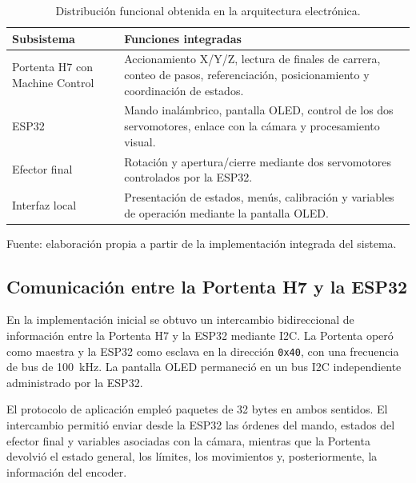 \begin{table}[H]
    \centering
    \caption{Distribución funcional obtenida en la arquitectura electrónica.}
    \label{tab:fase4_resultado_arquitectura}
    \begin{tabular}{p{}p{}}
        \hline
        Subsistema & Funciones integradas \\
        \hline
        Portenta H7 con Machine Control &
        Accionamiento X/Y/Z, lectura de finales de carrera, conteo de pasos, referenciación, posicionamiento y coordinación de estados. \\

        ESP32 &
        Mando inalámbrico, pantalla OLED, control de los dos servomotores, enlace con la cámara y procesamiento visual. \\

        Efector final &
        Rotación y apertura/cierre mediante dos servomotores controlados por la ESP32. \\

        Interfaz local &
        Presentación de estados, menús, calibración y variables de operación mediante la pantalla OLED. \\
        \hline
    \end{tabular}

    \par\small\raggedright Fuente: elaboración propia a partir de la implementación integrada del sistema.
\end{table}


\subsection{Comunicación entre la Portenta H7 y la ESP32}

En la implementación inicial se obtuvo un intercambio bidireccional de información entre la Portenta H7 y la ESP32 mediante I2C. La Portenta operó como maestra y la ESP32 como esclava en la dirección \texttt{0x40}, con una frecuencia de bus de 100~kHz. La pantalla OLED permaneció en un bus I2C independiente administrado por la ESP32.

El protocolo de aplicación empleó paquetes de 32 bytes en ambos sentidos. El intercambio permitió enviar desde la ESP32 las órdenes del mando, estados del efector final y variables asociadas con la cámara, mientras que la Portenta devolvió el estado general, los límites, los movimientos y, posteriormente, la información del encoder.

